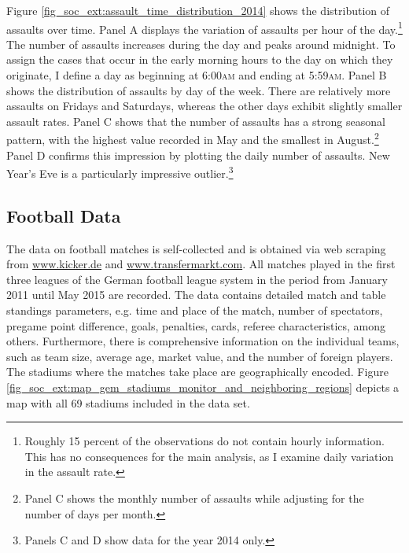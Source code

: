 Figure \ref{fig_soc_ext:assault_time_distribution_2014} shows the distribution of assaults over time. Panel A displays the variation of assaults per hour of the day.\footnote{Roughly 15 percent of the observations do not contain hourly information. This has no consequences for the main analysis, as I examine daily variation in the assault rate.} The number of assaults increases during the day and peaks around midnight. To assign the cases that occur in the early morning hours to the day on which they originate, I define a day as beginning at 6:00\textsc{am} and ending at 5:59\textsc{am}. Panel B shows the distribution of assaults by day of the week. There are relatively more assaults on Fridays and Saturdays, whereas the other days exhibit slightly smaller assault rates. Panel C shows that the number of assaults has a strong seasonal pattern, with the highest value recorded in May and the smallest in August.\footnote{Panel C shows the monthly number of assaults while adjusting for the number of days per month.} Panel D confirms this impression by plotting the daily number of assaults. New Year's Eve is a particularly impressive outlier.\footnote{Panels C and D show data for the year 2014 only.}






\subsection{Football Data}
The data on football matches is self-collected and is obtained via web scraping from \url{www.kicker.de} and \url{www.transfermarkt.com}. All matches played in the first three leagues of the German football league system in the period from January 2011 until May 2015 are recorded. The data contains detailed match and table standings parameters, e.g. time and place of the match, number of spectators, pregame point difference, goals, penalties, cards, referee characteristics, among others. Furthermore, there is comprehensive information on the individual teams, such as team size, average age, market value, and the number of foreign players. The stadiums where the matches take place are geographically encoded. Figure \ref{fig_soc_ext:map_gem_stadiums_monitor_and_neighboring_regions} depicts a map with all 69 stadiums included in the data set.







